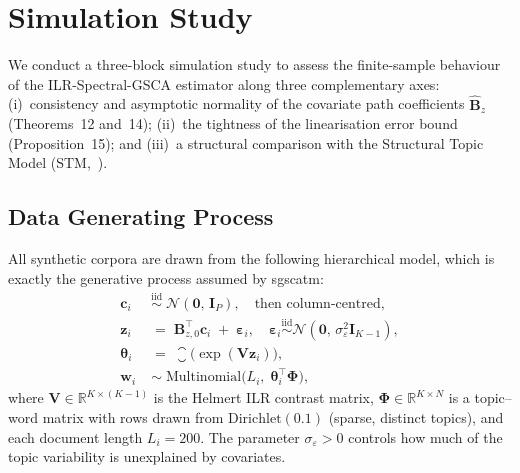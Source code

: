 \section{Simulation Study}
\label{sec:simulation}

We conduct a three-block simulation study to assess the finite-sample
behaviour of the ILR-Spectral-GSCA estimator along three complementary axes:
(i)~consistency and asymptotic normality of the covariate path
coefficients $\hat{\mathbf{B}}_z$ (Theorems~12 and~14); (ii)~the
tightness of the linearisation error bound (Proposition~15); and
(iii)~a structural comparison with the Structural Topic Model
(STM,~\citealt{roberts2014stm}).


\subsection{Data Generating Process}
\label{subsec:dgp}

All synthetic corpora are drawn from the following hierarchical model,
which is exactly the generative process assumed by sgscatm:
%
\begin{align}
  \mathbf{c}_i \;&\overset{\mathrm{iid}}{\sim}\;
      \mathcal{N}(\mathbf{0},\,\mathbf{I}_P),
      \quad \text{then column-centred},
      \label{eq:dgp_cov}\\
  \mathbf{z}_i \;&=\;
      \mathbf{B}_{z,0}^{\!\top}\mathbf{c}_i
      \;+\;\boldsymbol{\varepsilon}_i,
      \quad
      \boldsymbol{\varepsilon}_i \overset{\mathrm{iid}}{\sim}
      \mathcal{N}(\mathbf{0},\,\sigma_\varepsilon^2\mathbf{I}_{K-1}),
      \label{eq:dgp_z}\\
  \boldsymbol{\theta}_i \;&=\;
      \closure\!\bigl(\exp(\mathbf{V}\mathbf{z}_i)\bigr),
      \label{eq:dgp_theta}\\
  \mathbf{w}_i \;&\sim\;
      \mathrm{Multinomial}\!\bigl(L_i,\;
        \boldsymbol{\theta}_i^{\!\top}\boldsymbol{\Phi}\bigr),
      \label{eq:dgp_w}
\end{align}
%
where $\mathbf{V}\in\mathbb{R}^{K\times(K-1)}$ is the Helmert ILR
contrast matrix, $\boldsymbol{\Phi}\in\mathbb{R}^{K\times N}$ is a
topic--word matrix with rows drawn from $\mathrm{Dirichlet}(0.1)$
(sparse, distinct topics), and each document length $L_i = 200$.
The parameter $\sigma_\varepsilon>0$ controls how much of the topic
variability is unexplained by covariates.


